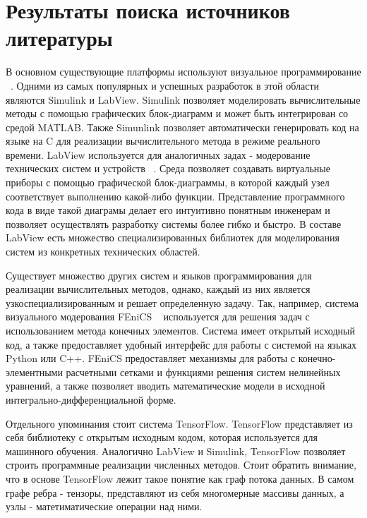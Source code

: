\section{Результаты поиска источников литературы}

В основном существующие платформы используют визуальное программирование ~\cite{CSEComputationalSteering}. Одними из самых популярных и успешных разработок в этой области являются Simulink и LabView. Simulink позволяет моделировать вычислительные методы с помощью графических блок-диаграмм и может быть интегрирован со средой MATLAB. Также Simunlink позволяет автоматически генерировать код на языке на C для реализации вычислительного метода в режиме реального времени. LabView используется для аналогичных задах - модерование технических систем и устройств ~\cite{LabViewUsage}. Среда позволяет создавать виртуальные приборы с помощью графической блок-диаграммы, в которой каждый узел соответствует выполнению какой-либо функции. Представление программного кода в виде такой диаграмы делает его интуитивно понятным инженерам и позволяет осуществлять разработку системы более гибко и быстро. В составе LabView есть множество специализированных библиотек для моделирования систем из конкретных технических областей.

Существует множество других систем и языков программирования для реализации вычислительных методов, однако, каждый из них является узкоспециализированным и решает определенную задачу. Так, например, система визуального модерования FEniCS ~\cite{FEniCSFramework} используется для решения задач с использованием метода конечных элементов. Система имеет открытый исходный код, а также предоставляет удобный интерфейс для работы с системой на языках Python или C++. FEniCS предоставляет механизмы для работы с конечно-элементными расчетными сетками и функциями решения систем нелинейных уравнений, а также позволяет вводить математические модели в исходной интегрально-дифференциальной форме.

Отдельного упоминания стоит система TensorFlow. TensorFlow представляет из себя библиотеку с открытым исходным кодом, которая используется для машинного обучения. Аналогично LabView и Simulink, TensorFlow позволяет строить программные реализации численных методов. Стоит обратить внимание, что в основе TensorFlow лежит такое понятие как граф потока данных. В самом графе ребра - тензоры, представляют из себя многомерные массивы данных, а узлы - матетиматические операции над ними.

